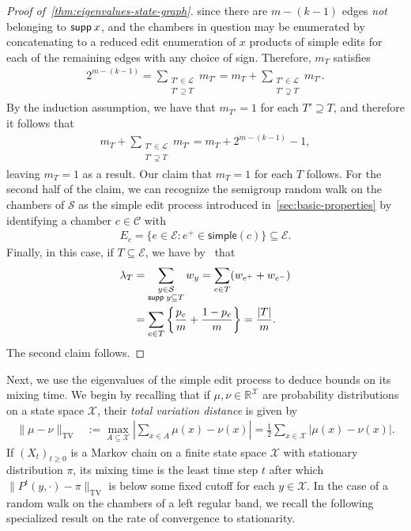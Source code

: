\documentclass[11pt,a4paper]{article}
\newcommand{\supp}{{\mathsf{supp }\hspace{.075cm}}}
\newcommand{\simple}[1]{\mathrm{\mathsf{simple}}({#1})}
\begin{document}
\begin{proof}[Proof of~\cref{thm:eigenvalues-state-graph}]
    since there are ${m} - (k-1)$ edges \emph{not} belonging to $\supp{x}$, and the chambers in question may be enumerated by concatenating to a reduced edit enumeration of $x$ products of simple edits for each of the remaining edges with any choice of sign. Therefore, $m_T$ satisfies
        \begin{align*}
            2^{{m} - (k-1)} = \sum_{\substack{T'\in \mathcal{L} \\ T'\supseteq T}} m_{T'} = m_T +  \sum_{\substack{T'\in \mathcal{L} \\ T'\supsetneq T}} m_{T'}.
        \end{align*}
    By the induction assumption, we have that $m_{T'}=1$ for each $T'\supseteq T$, and therefore it follows that
        \begin{align*}
            m_T +  \sum_{\substack{T'\in \mathcal{L} \\ T'\supsetneq T}} m_{T'} = m_T + 2^{{m} - (k-1)} - 1,
        \end{align*}
    leaving $m_T=1$ as a result. Our claim that $m_T=1$ for each $T$ follows. For the second half of the claim, we can recognize the semigroup random walk on the chambers of $\mathcal{S}$ as the simple edit process introduced in~\cref{sec:basic-properties} by identifying a chamber $c\in\mathcal{C}$ with 
        \begin{align*}
            E_c = \{e\in \mathcal{E} : e^+\in\simple{c}\}\subseteq\mathcal{E}.
        \end{align*}
    Finally, in this case, if $T\subseteq {\mathcal{E}}$, we have by~\cite[Thm. 1]{brownSemigroupsRingsMarkov2000} that
        \begin{align*}
            \lambda_T &= \sum_{\substack{y\in \mathcal{S} \\ \supp{y}\subseteq T}} w_y = \sum_{e\in T} (w_{{e^+}} + w_{{e^-}})\\
            &= \sum_{e\in T} \left\{\frac{p_e}{{m}} + \frac{1-p_e}{{m}}\right\} = \frac{|T|}{{m}}.
        \end{align*}
    The second claim follows.
\end{proof}

Next, we use the eigenvalues of the simple edit process to deduce bounds on its mixing time. We begin by recalling that if $\mu, \nu \in\mathbb{R}^\mathcal{X}$ are probability distributions on a state space $\mathcal{X}$, their \emph{total variation distance} is given by
    \begin{align}\label{eq:total-variation-dist}
        \|\mu - \nu\|_{\mathrm{TV}} &:= \max_{A\subseteq \mathcal{X}} \left|\sum_{x\in A} \mu(x) - \nu(x)\right|=\frac{1}{2}\sum_{x\in \mathcal{X}} |\mu(x) - \nu(x)|.
    \end{align}
If $(X_t)_{t\geq 0}$ is a Markov chain on a finite state space $\mathcal{X}$ with stationary distribution $\pi$, its mixing time is the least time step $t$ after which $\|P^t(y, \cdot) - \pi\|_{\mathrm{TV}}$ is below some fixed cutoff for each $y\in\mathcal{X}$. In the case of a random walk on the chambers of a left regular band, we recall the following specialized result on the rate of convergence to stationarity.
\end{document}

